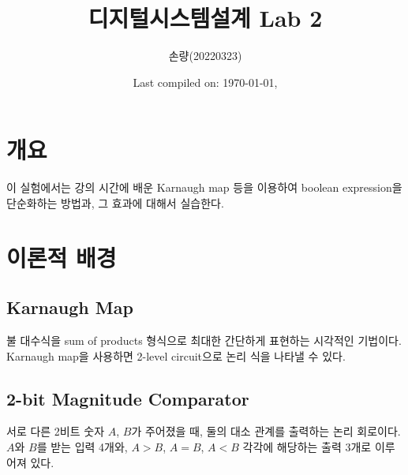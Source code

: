 \documentclass{scrartcl}
\title{디지털시스템설계 Lab 2}
\author{손량(20220323)}
\date{Last compiled on: \today, \currenttime}
\begin{document}
\maketitle

\section{개요}
이 실험에서는 강의 시간에 배운 Karnaugh map 등을 이용하여 boolean expression을 단순화하는 방법과, 그 효과에 대해서 실습한다.

\section{이론적 배경}

\subsection{Karnaugh Map}
불 대수식을 sum of products 형식으로 최대한 간단하게 표현하는 시각적인 기법이다. Karnaugh map을 사용하면 2-level circuit으로 논리 식을 나타낼 수 있다.

\subsection{2-bit Magnitude Comparator}
서로 다른 2비트 숫자 \(A\), \(B\)가 주어졌을 때, 둘의 대소 관계를 출력하는 논리 회로이다. \(A\)와 \(B\)를 받는 입력 4개와, \(A > B\), \(A = B\), \(A < B\) 각각에 해당하는 출력 3개로 이루어져 있다.
\end{document}
